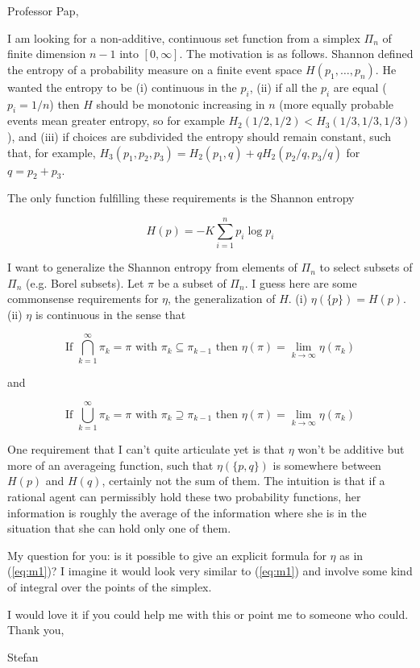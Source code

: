\documentclass[11pt]{article}
\begin{document}
Professor Pap,

I am looking for a non-additive, continuous set function from a
simplex $\Pi_{n}$ of finite dimension $n-1$ into $[0,\infty]$. The
motivation is as follows. Shannon defined the entropy of a probability
measure on a finite event space $H(p_{1},\ldots,p_{n})$. He wanted the
entropy to be (i) continuous in the $p_{i}$, (ii) if all the $p_{i}$
are equal ($p_{i}=1/n$) then $H$ should be monotonic increasing in $n$
(more equally probable events mean greater entropy, so for example
$H_{2}(1/2,1/2)<H_{3}(1/3,1/3,1/3)$), and (iii) if choices are
subdivided the entropy should remain constant, such that, for
example, $H_{3}(p_{1},p_{2},p_{3})=
H_{2}(p_{1},q)+qH_{2}(p_{2}/q,p_{3}/q)$ for $q=p_{2}+p_{3}$.

The only function fulfilling these requirements is the Shannon entropy

\begin{equation}
  \label{eq:m1}
  H(p)=-K\sum_{i=1}^{n}p_{i}\log{}p_{i}
\end{equation}

I want to generalize the Shannon entropy from elements of $\Pi_{n}$ to
select subsets of $\Pi_{n}$ (e.g. Borel subsets). Let $\pi$ be a
subset of $\Pi_{n}$. I guess here are some commonsense requirements
for $\eta$, the generalization of $H$. (i) $\eta(\{p\})=H(p)$. (ii)
$\eta$ is continuous in the sense that

\begin{displaymath}
  \mbox{If }\bigcap_{k=1}^{\infty}\pi_{k}=\pi\mbox{ with }\pi_{k}\subseteq\pi_{k-1}\mbox{ then }\eta(\pi)=\lim_{k\rightarrow\infty}\eta(\pi_{k})
\end{displaymath}

and

\begin{displaymath}
  \mbox{If }\bigcup_{k=1}^{\infty}\pi_{k}=\pi\mbox{ with }\pi_{k}\supseteq\pi_{k-1}\mbox{ then }\eta(\pi)=\lim_{k\rightarrow\infty}\eta(\pi_{k})
\end{displaymath}

One requirement that I can't quite articulate yet is that $\eta$ won't
be additive but more of an averageing function, such that
$\eta(\{p,q\})$ is somewhere between $H(p)$ and $H(q)$, certainly not
the sum of them. The intuition is that if a rational agent can
permissibly hold these two probability functions, her information is
roughly the average of the information where she is in the situation
that she can hold only one of them.

My question for you: is it possible to give an explicit formula for
$\eta$ as in (\ref{eq:m1})? I imagine it would look very similar to
(\ref{eq:m1}) and involve some kind of integral over the points of the
simplex.

I would love it if you could help me with this or point me to someone
who could. Thank you,

Stefan
\end{document}
